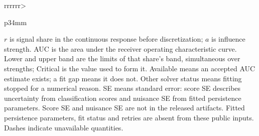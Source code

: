 \begin{table}[tp]
\begin{tabular}{rrrrrr>{\raggedright\arraybackslash}p{34mm}}
\end{tabular}
\par\smallskip\parbox{\linewidth}{$r$ is signal share in the continuous response before discretization; $a$ is influence strength. AUC is the area under the receiver operating characteristic curve. Lower and upper band are the limits of that share's band, simultaneous over strengths; Critical is the value used to form it. Available means an accepted AUC estimate exists; a fit gap means it does not. Other solver status means fitting stopped for a numerical reason. SE means standard error: score SE describes uncertainty from classification scores and nuisance SE from fitted persistence parameters. Score SE and nuisance SE are not in the released artifacts. Fitted persistence parameters, fit status and retries are absent from these public inputs. Dashes indicate unavailable quantities.}
\end{table}
